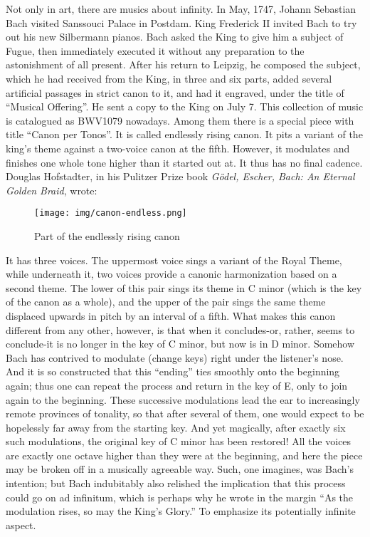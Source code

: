 \documentclass{article}
\begin{document}
Not only in art, there are musics about infinity. In May, 1747, Johann Sebastian Bach visited Sanssouci Palace in Postdam. King Frederick II invited Bach to try out his new Silbermann pianos. Bach asked the King to give him a subject of Fugue, then immediately executed it without any preparation to the astonishment of all present. After his return to Leipzig, he composed the subject, which he had received from the King, in three and six parts, added several artificial passages in strict canon to it, and had it engraved, under the title of ``Musical Offering''. He sent a copy to the King on July 7. This collection of music is catalogued as BWV1079 nowadays. Among them there is a special piece with title ``Canon per Tonos''. It is called endlessly rising canon. It pits a variant of the king’s theme against a two-voice canon at the fifth. However, it modulates and finishes one whole tone higher than it started out at. It thus has no final cadence. Douglas Hofstadter, in his Pulitzer Prize book {\em Gödel, Escher, Bach: An Eternal Golden Braid}, wrote:

\begin{figure}[htbp]
 \centering
 \texttt{[image: img/canon-endless.png]}
 \captionsetup{labelformat=empty}
 \caption{Part of the endlessly rising canon}
 \label{fig:canon-endless}
\end{figure}

It has three voices. The uppermost voice sings a variant of the Royal Theme, while underneath it, two voices provide a canonic harmonization based on a second theme. The lower of this pair sings its theme in C minor (which is the key of the canon as a whole), and the upper of the pair sings the same theme displaced upwards in pitch by an interval of a fifth. What makes this canon different from any other, however, is that when it concludes-or, rather, seems to conclude-it is no longer in the key of C minor, but now is in D minor. Somehow Bach has contrived to modulate (change keys) right under the listener's nose. And it is so constructed that this ``ending'' ties smoothly onto the beginning again; thus one can repeat the process and return in the key of E, only to join again to the beginning. These successive modulations lead the ear to increasingly remote provinces of tonality, so that after several of them, one would expect to be hopelessly far away from the starting key. And yet magically, after exactly six such modulations, the original key of C minor has been restored! All the voices are exactly one octave higher than they were at the beginning, and here the piece may be broken off in a musically agreeable way. Such, one imagines, was Bach's intention; but Bach indubitably
also relished the implication that this process could go on ad infinitum, which is perhaps why he wrote in the margin ``As the modulation rises, so may the King's Glory.'' To emphasize its potentially infinite aspect\cite{GEB}.
\end{document}
